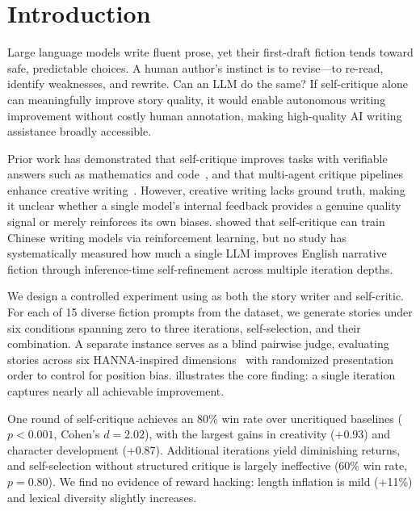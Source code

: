 \section{Introduction}
\label{sec:intro}

Large language models write fluent prose, yet their first-draft fiction tends toward safe, predictable choices.
A human author's instinct is to revise---to re-read, identify weaknesses, and rewrite.
Can an LLM do the same?
If self-critique alone can meaningfully improve story quality, it would enable autonomous writing improvement without costly human annotation, making high-quality AI writing assistance broadly accessible.

Prior work has demonstrated that self-critique improves tasks with verifiable answers such as mathematics and code~\citep{madaan2023selfrefine}, and that multi-agent critique pipelines enhance creative writing~\citep{bae2024critics}.
However, creative writing lacks ground truth, making it unclear whether a single model's internal feedback provides a genuine quality signal or merely reinforces its own biases.
\citet{jia2025writingzero} showed that self-critique can train Chinese writing models via reinforcement learning, but no study has systematically measured how much a single LLM improves English narrative fiction through inference-time self-refinement across multiple iteration depths.

We design a controlled experiment using \gptfour as both the story writer and self-critic.
For each of 15 diverse fiction prompts from the \writingprompts dataset, we generate stories under six conditions spanning zero to three \critiquerevise iterations, \bestofn self-selection, and their combination.
A separate \gptfour instance serves as a blind pairwise judge, evaluating stories across six HANNA-inspired dimensions~\citep{chhun2022hanna} with randomized presentation order to control for position bias.
 illustrates the core finding: a single \critiquerevise iteration captures nearly all achievable improvement.

One round of self-critique achieves an 80\% win rate over uncritiqued baselines ($p < 0.001$, Cohen's $d = 2.02$), with the largest gains in creativity (+0.93) and character development (+0.87).
Additional iterations yield diminishing returns, and self-selection without structured critique is largely ineffective (60\% win rate, $p = 0.80$).
We find no evidence of reward hacking: length inflation is mild (+11\%) and lexical diversity slightly increases.


